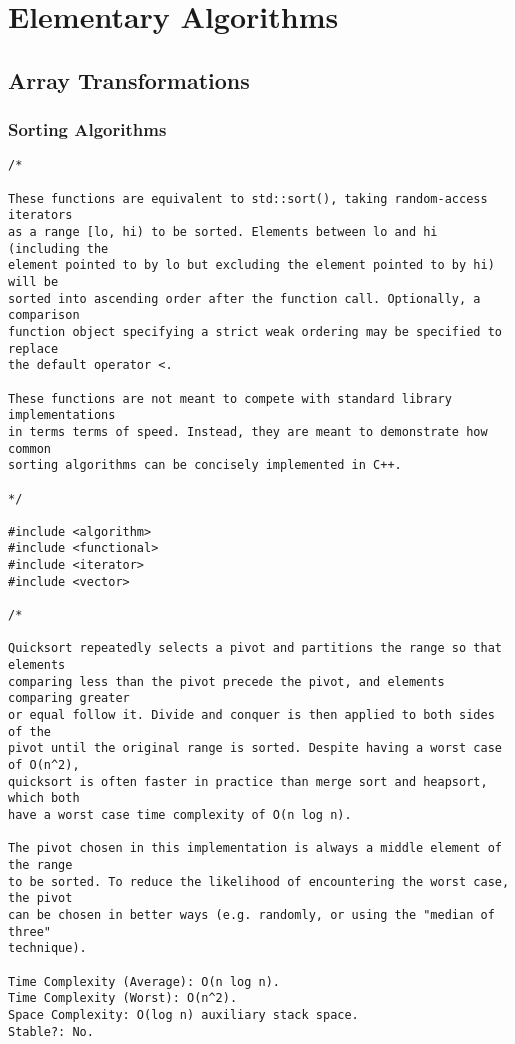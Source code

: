 \chapter{Elementary Algorithms}

\section{Array Transformations}
\setcounter{section}{1}
\setcounter{subsection}{0}
\subsection{Sorting Algorithms}
\begin{lstlisting}
/*

These functions are equivalent to std::sort(), taking random-access iterators
as a range [lo, hi) to be sorted. Elements between lo and hi (including the
element pointed to by lo but excluding the element pointed to by hi) will be
sorted into ascending order after the function call. Optionally, a comparison
function object specifying a strict weak ordering may be specified to replace
the default operator <.

These functions are not meant to compete with standard library implementations
in terms terms of speed. Instead, they are meant to demonstrate how common
sorting algorithms can be concisely implemented in C++.

*/

#include <algorithm>
#include <functional>
#include <iterator>
#include <vector>

/*

Quicksort repeatedly selects a pivot and partitions the range so that elements
comparing less than the pivot precede the pivot, and elements comparing greater
or equal follow it. Divide and conquer is then applied to both sides of the
pivot until the original range is sorted. Despite having a worst case of O(n^2),
quicksort is often faster in practice than merge sort and heapsort, which both
have a worst case time complexity of O(n log n).

The pivot chosen in this implementation is always a middle element of the range
to be sorted. To reduce the likelihood of encountering the worst case, the pivot
can be chosen in better ways (e.g. randomly, or using the "median of three"
technique).

Time Complexity (Average): O(n log n).
Time Complexity (Worst): O(n^2).
Space Complexity: O(log n) auxiliary stack space.
Stable?: No.


\end{lstlisting}
